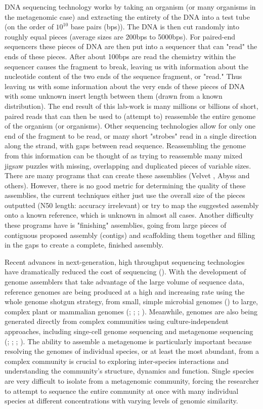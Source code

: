 \documentclass[phd,tocprelim]{cornell}
\begin{document}
DNA sequencing technology works by taking an organism (or many organisms in the metagenomic
case) and extracting the entirety of the DNA into a test tube (on the order of $10^{10}$ base pairs (bps)).
The DNA is then cut randomly into roughly equal pieces (average sizes are 200bps to 5000bps). For paired-end sequencers these pieces
of DNA are then put into a sequencer that can "read" the ends of these pieces. After about 100bps are read the chemistry within the sequencer causes the fragment to break, leaving us with information about the nucleotide content of the two ends of the sequence fragment, or "read."
Thus leaving us with some information about the very ends of these pieces of DNA with some
unknown insert length between them (drawn from a known distribution). The end result of this
lab-work is many millions or billions of short, paired reads that can then be used to (attempt to)
reassemble the entire genome of the organism (or organisms). Other sequencing technologies allow for only one end of the fragment to be read, or many short "strobes" read in a single direction along the strand, with gaps between read sequence. Reassembling the genome from this information can be thought of as trying to
reassemble many mixed jigsaw puzzles with missing, overlapping and duplicated pieces of variable
sizes. There are many programs that can create these assemblies (Velvet \cite{Zerbino2008}, Abyss \cite{Simpson2009} and others). However, there
is no good metric for determining the quality of these assemblies, the current techniques either just
use the overall size of the pieces outputted (N50 length: accuracy irrelevant) or try to map the suggested
assembly onto a known reference, which is unknown in almost all cases. Another difficulty these 
programs have is "finishing" assemblies, going from large pieces of contiguous proposed assembly
(contigs) and scaffolding them together and filling in the gaps to create a complete, finished
assembly.

Recent advances in next-generation, high throughput sequencing technologies have dramatically reduced the cost of sequencing (\cite{Metzker2010}).  With the development of genome assemblers that take advantage of the large volume of sequence data, reference genomes are being produced at a high and increasing rate using the whole genome shotgun strategy, from small, simple microbial genomes (\cite{Wu2009}) to large, complex plant or mammalian genomes (\cite{Fujimoto2010};  \cite{Li2010}; \cite{Schmutz2010}; \cite{Zimin2008}). Meanwhile, genomes are also being generated directly from complex communities using culture-independent approaches, including singe-cell genome sequencing and metagenome sequencing (\cite{Woyke2010}; \cite{Yilmaz2011}; \cite{Hess2011}; \cite{Iverson2012}). The ability to assemble a metagenome is particularly important because resolving the genomes of individual species, or at least the most abundant, from a complex community is crucial to exploring inter-species interactions and understanding the community's structure, dynamics and function. Single species are very difficult to isolate from a metagenomic community, forcing the researcher to attempt to sequence the entire community at once with many individual species at different concentrations with varying levels of genomic similarity.
\end{document}
